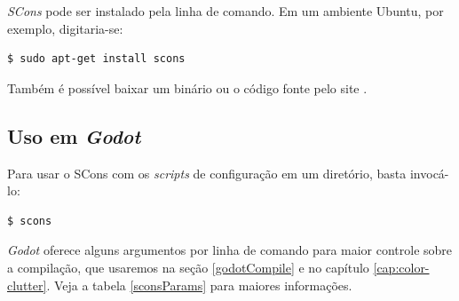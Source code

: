 \textit{SCons} pode ser instalado pela linha de comando. Em um ambiente Ubuntu, por exemplo, digitaria-se:

\begin{lstlisting}[language=Bash]
$ sudo apt-get install scons
\end{lstlisting}

Também é possível baixar um binário ou o código fonte pelo site \citep{sconsDownload}.


\subsection{Uso em \textit{Godot}}

Para usar o SCons com os \textit{scripts} de configuração em um diretório, basta invocá-lo:

\begin{lstlisting}[language=Bash]
$ scons
\end{lstlisting}

\textit{Godot} oferece alguns argumentos por linha de comando para maior controle sobre a compilação, que usaremos na seção \ref{godotCompile} e no capítulo \ref{cap:color-clutter}. Veja a tabela \ref{sconsParams} para maiores informações.

